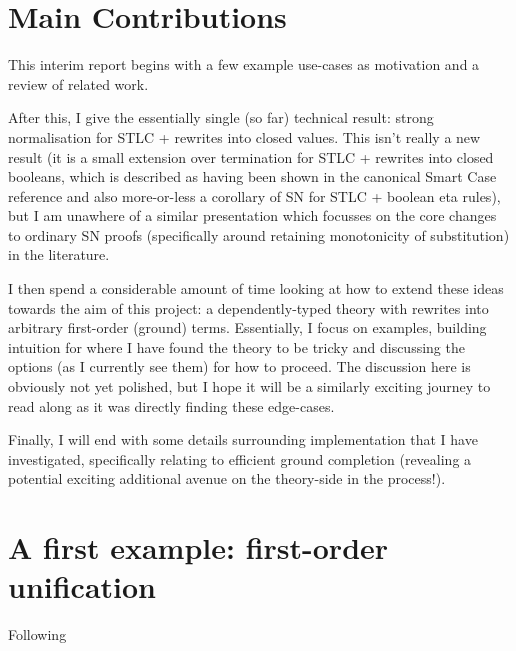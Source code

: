 \documentclass[
    a4paper, %
    fontsize=11pt, %
    twoside=false, %
	numbers=noenddot, %
	fontmethod=tex, %
]{kaobook}
\begin{document}
\section{Main Contributions}

This interim report begins with a few example use-cases as motivation and a
review of related work. 

After this, I give the essentially single (so far) 
technical result: strong normalisation for STLC + rewrites into closed values.
This isn't really a new result (it is a small extension over termination for 
STLC + rewrites into closed booleans, which is described as having been shown
in the canonical Smart Case reference and also more-or-less a corollary 
of SN for STLC + boolean eta rules), but I am unawhere of a similar 
presentation which focusses on the
core changes to ordinary SN proofs (specifically around retaining monotonicity
of substitution) in the literature.

I then spend a considerable amount of time looking at how to extend these ideas
towards the aim of this project: a dependently-typed theory with rewrites into 
arbitrary first-order (ground) terms. Essentially, I focus on examples, building
intuition for where I have found the theory to be tricky and discussing the
options (as I currently see them) for how to proceed.
The discussion here is obviously not yet polished, but I hope it will be
a similarly exciting journey to read along as it was directly finding these
edge-cases.

Finally, I will end with some details surrounding implementation that I have 
investigated, specifically relating to efficient ground completion (revealing
a potential exciting additional avenue on the theory-side in the process!).






\section{A first example: first-order unification}

Following 

















\end{document}
